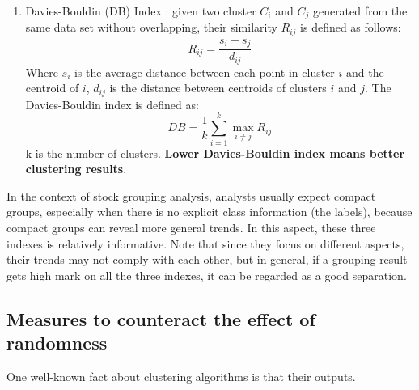 \begin{enumerate}
    \item Davies-Bouldin (DB) Index \cite{davies1979cluster}: given two cluster $C_i$ and $C_j$ generated from the same data set without overlapping, their similarity $R_{ij}$ is defined as follows:
    \begin{equation}
        R_{ij} = \frac{s_i + s_j}{d_{ij}}
    \end{equation}
    Where $s_i$ is the average distance between each point in cluster $i$ and the centroid of $i$, $d_{ij}$ is the distance between centroids of clusters $i$ and $j$. The Davies-Bouldin index is defined as:
    \begin{equation}
        DB = \frac{1}{k} \sum_{i=1}^k\max_{i\neq j}R_{ij}
    \end{equation}
    k is the number of clusters. \textbf{Lower Davies-Bouldin index means better clustering results}.
\end{enumerate}
In the context of stock grouping analysis, analysts usually expect compact groups, especially when there is no explicit class information (the labels), because compact groups can reveal more general trends. In this aspect, these three indexes is relatively informative. Note that since they focus on different aspects, their trends may not comply with each other, but in general, if a grouping result gets high mark on all the three indexes, it can be regarded as a good separation.

\subsection{Measures to counteract the effect of randomness}
One well-known fact about clustering algorithms is that their outputs.

